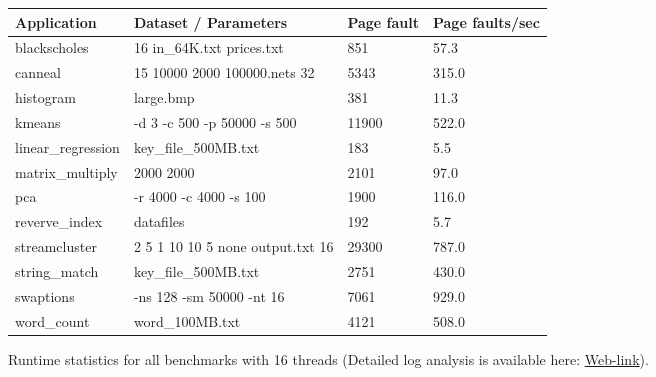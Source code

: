 \begin{figure}[t]
\centering
\myfontsize
{
\begin{tabular}{m{1.6cm}|m{3.2cm}| m{1.2cm}|m{1.2cm}}
   { Application} & Dataset / Parameters & Page fault & Page faults/sec\\
  \hline \hline
    blackscholes& 16 in\_64K.txt prices.txt &851& 57.3 \\
    canneal& 15 10000 2000 100000.nets 32 & 5343& 315.0 \\
    histogram& large.bmp & 381& 11.3  \\
    kmeans& -d 3 -c 500 -p 50000 -s 500 & 11900& 522.0  \\
    linear\_regression& key\_file\_500MB.txt & 183& 5.5  \\
    matrix\_multiply& 2000 2000 & 2101& 97.0  \\
    pca& -r 4000 -c 4000 -s 100 & 1900& 116.0\\
    reverve\_index & datafiles & 192& 5.7  \\
    streamcluster& 2 5 1 10 10 5 none output.txt 16 & 29300& 787.0\\
    string\_match &key\_file\_500MB.txt & 2751& 430.0\\
    swaptions & -ns 128 -sm 50000 -nt 16  & 7061& 929.0 \\
    word\_count& word\_100MB.txt	 & 4121& 508.0  \\

\hline
\end{tabular}
}


\caption{\label{tab:apps} Runtime statistics for all benchmarks with 16 threads (Detailed log analysis is available here: \href{https://mic92.github.io/inspector/index.html\#measurement_table}{Web-link}). }                                                                                                                                  


\end{figure}
